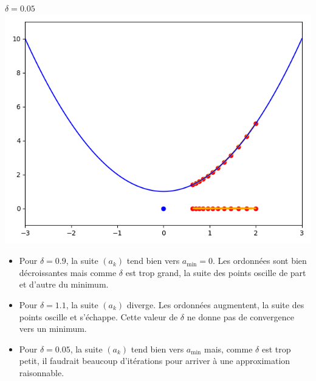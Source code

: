 \documentclass[11pt,class=report,crop=false]{standalone}
\begin{document}
\begin{exemple}
\begin{center}
\begin{minipage}{0.32\textwidth}
\begin{center}
\end{center}
\end{minipage}
\begin{minipage}{0.32\textwidth}
\begin{center}
$\delta=0.05$
\includegraphics[scale=\myscale,scale=0.3]{figures/descente_une_var_05}
\end{center}
\end{minipage}
\end{center}

\begin{itemize}
  \item Pour $\delta = 0.9$, la suite $(a_k)$ tend bien vers $a_{\min} = 0$. Les ordonnées sont bien décroissantes mais comme $\delta$ est trop grand, la suite des points oscille de part et d'autre du minimum.
  
  \item Pour $\delta = 1.1$, la suite $(a_k)$ diverge. Les ordonnées augmentent, la suite des points oscille et s'échappe. Cette valeur de $\delta$ ne donne pas de convergence vers un minimum.
  
  \item Pour $\delta = 0.05$, la suite $(a_k)$ tend bien vers $a_{\min}$ mais, comme $\delta$ est trop petit, il faudrait beaucoup d'itérations pour arriver à une approximation raisonnable.
  
\end{itemize}
\end{exemple}
\end{document}
